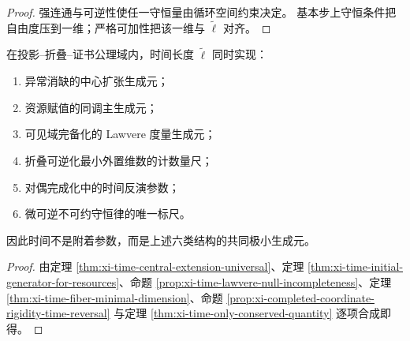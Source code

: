 \begin{proof}
强连通与可逆性使任一守恒量由循环空间约束决定。
基本步上守恒条件把自由度压到一维；严格可加性把该一维与 \(\widetilde\ell\) 对齐。
\end{proof}

\begin{theorem}[时间统一语义定理]\label{thm:xi-time-unified-semantic-generator}
在投影--折叠--证书公理域内，时间长度 \(\widetilde\ell\) 同时实现：
\begin{enumerate}
  \item 异常消缺的中心扩张生成元；
  \item 资源赋值的同调主生成元；
  \item 可见域完备化的 Lawvere 度量生成元；
  \item 折叠可逆化最小外置维数的计数量尺；
  \item 对偶完成化中的时间反演参数；
  \item 微可逆不可约守恒律的唯一标尺。
\end{enumerate}
因此时间不是附着参数，而是上述六类结构的共同极小生成元。
\end{theorem}

\begin{proof}
由定理 \ref{thm:xi-time-central-extension-universal}、定理 \ref{thm:xi-time-initial-generator-for-resources}、命题 \ref{prop:xi-time-lawvere-null-incompleteness}、定理 \ref{thm:xi-time-fiber-minimal-dimension}、命题 \ref{prop:xi-completed-coordinate-rigidity-time-reversal} 与定理 \ref{thm:xi-time-only-conserved-quantity} 逐项合成即得。
\end{proof}




\endinput

\begin{theorem}[模流即时间：长度余圈诱导的动力学唯一性]\label{thm:xi-modular-flow-equals-time-cocycle}
设 \(\mathcal G\) 为由可审计投影词与证书等价生成的可测群胚，\(\widetilde\ell:\mathcal G\to\mathbb Z\) 为可加 \(1\)-余圈：
\[
\widetilde\ell(gh)=\widetilde\ell(g)+\widetilde\ell(h).
\]
记 \(\mathcal M:=W^\ast(\mathcal G)\)。
对任意 \(\lambda>0\)，定义权
\[
\varphi_\lambda(f):=\int_{\mathcal G} f(g)\,e^{-\lambda\widetilde\ell(g)}\,d\nu(g),\qquad f\in C_c(\mathcal G).
\]
则 Tomita--Takesaki 模自同构群满足
\[
(\sigma_t^{\varphi_\lambda}f)(g)=e^{it\lambda\widetilde\ell(g)}\,f(g).
\]
若取对象函数 \(b:\mathcal G^{(0)}\to\mathbb R\) 并作 gauge 变换，则 Connes 导数满足
\[
(D\varphi_{\lambda,b}:D\varphi_\lambda)_t(g)
=e^{it\lambda\,(b(r(g))-b(s(g)))}.
\]
故时间 gauge 自由度与 Connes \(1\)-余圈完全同一。
\end{theorem}

